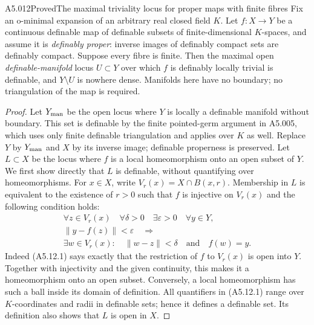 \begin{saresult}{A5.012}{Proved}{The maximal triviality locus for proper maps with finite fibres}
Fix an o-minimal expansion of an arbitrary real closed field $K$.
Let $f:X\to Y$ be a continuous definable map of definable subsets
of finite-dimensional $K$-spaces, and assume it is \emph{definably
proper}: inverse images of definably compact sets are definably
compact. Suppose every fibre is finite. Then the maximal open
\emph{definable-manifold} locus $U\subset Y$ over which $f$
is definably locally trivial is definable, and $Y\setminus U$
is nowhere dense. Manifolds here have no boundary; no triangulation
of the map is required.
\end{saresult}
\begin{proof}
Let $Y_{\rm man}$ be the open locus where $Y$ is locally a
definable manifold without boundary. This set is definable by the
finite pointed-germ argument in A5.005, which uses only finite
definable triangulation and applies over $K$ as well. Replace $Y$
by $Y_{\rm man}$ and $X$ by its inverse image; definable properness
is preserved. Let
$L\subset X$ be the locus where $f$ is a local homeomorphism
onto an open subset of $Y$. We first show directly that $L$
is definable, without quantifying over homeomorphisms.
For $x\in X$, write $V_r(x)=X\cap B(x,r)$. Membership in $L$
is equivalent to the existence of $r>0$ such that $f$ is injective
on $V_r(x)$ and the following condition holds:
\[
\begin{gathered}
 \forall z\in V_r(x)\quad\forall\delta>0\quad
 \exists\varepsilon>0\quad\forall y\in Y,\\
 \|y-f(z)\|<\varepsilon\quad\Longrightarrow\\
 \exists w\in V_r(x):\quad\|w-z\|<\delta
       \quad\text{and}\quad f(w)=y.
\end{gathered}                                      \tag{A5.12.1}
\]
Indeed (A5.12.1) says exactly that the restriction of $f$ to
$V_r(x)$ is open into $Y$. Together with injectivity and the
given continuity, this makes it a homeomorphism onto an open
subset. Conversely, a local homeomorphism has such a ball
inside its domain of definition. All quantifiers in (A5.12.1)
range over $K$-coordinates and radii in definable sets; hence
it defines a definable set. Its definition also shows that $L$
is open in $X$.


\end{proof}
